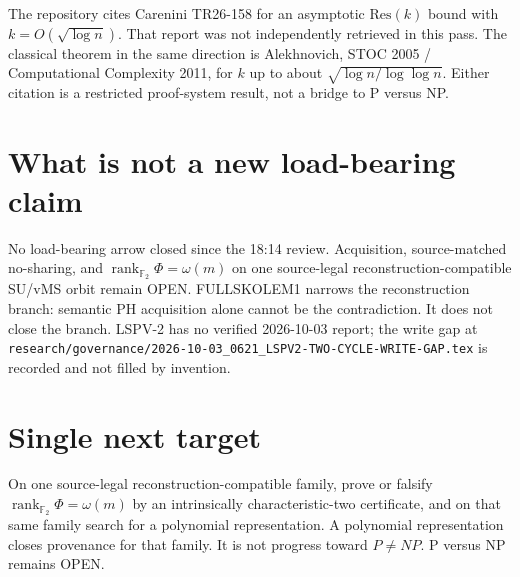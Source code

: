 \documentclass[11pt]{article}
\begin{document}
The repository cites Carenini TR26-158 for an asymptotic \(\mathrm{Res}(k)\) bound with
\(k=O(\sqrt{\log n})\). That report was not independently retrieved in this pass. The
classical theorem in the same direction is Alekhnovich, STOC 2005 / Computational
Complexity 2011, for \(k\) up to about \(\sqrt{\log n/\log\log n}\). Either citation is a
restricted proof-system result, not a bridge to P versus NP.

\section*{What is not a new load-bearing claim}
No load-bearing arrow closed since the 18:14 review. Acquisition, source-matched
no-sharing, and
\(\operatorname{rank}_{\mathbb F_2}\Phi=\omega(m)\)
on one source-legal reconstruction-compatible SU/vMS orbit remain OPEN.
FULLSKOLEM1 narrows the reconstruction branch: semantic PH acquisition alone cannot be
the contradiction. It does not close the branch. LSPV-2 has no verified 2026-10-03
report; the write gap at
\texttt{research/governance/2026-10-03\_0621\_LSPV2-TWO-CYCLE-WRITE-GAP.tex}
is recorded and not filled by invention.

\section*{Single next target}
On one source-legal reconstruction-compatible family, prove or falsify
\(\operatorname{rank}_{\mathbb F_2}\Phi=\omega(m)\)
by an intrinsically characteristic-two certificate, and on that same family search for a
polynomial representation. A polynomial representation closes provenance for that family.
It is not progress toward \(P\neq NP\).
P versus NP remains OPEN.

\end{document}
